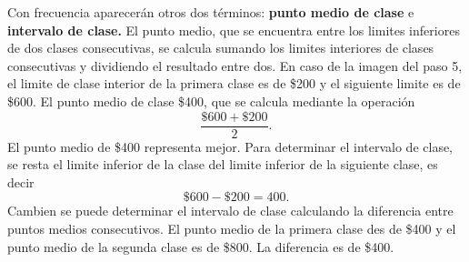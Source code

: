 \documentclass[]{article}
\begin{document}
Con frecuencia aparecerán otros dos términos: \textbf{punto medio de clase} e \textbf{intervalo de clase.} El punto medio, que se encuentra entre los limites inferiores de dos clases consecutivas, se calcula sumando los limites interiores de clases consecutivas y dividiendo el resultado entre dos. En caso de la imagen del paso 5, el limite de clase interior de la primera clase es de \$200 y el siguiente limite es de \$600. El punto medio de clase \$400, que se calcula mediante la operación \[ \frac{\$600+\$200}{2} .\] El punto medio de \$400 representa mejor. Para determinar el intervalo de clase, se resta el limite inferior de la clase del limite inferior de la siguiente clase, es decir \[ \$600 -\$200 =400.\]Cambien se puede determinar el intervalo de clase calculando la diferencia entre puntos medios consecutivos. El punto medio de la primera clase des de \$400 y el punto medio de la segunda clase es de \$800. La diferencia es de \$400.
\end{document}
